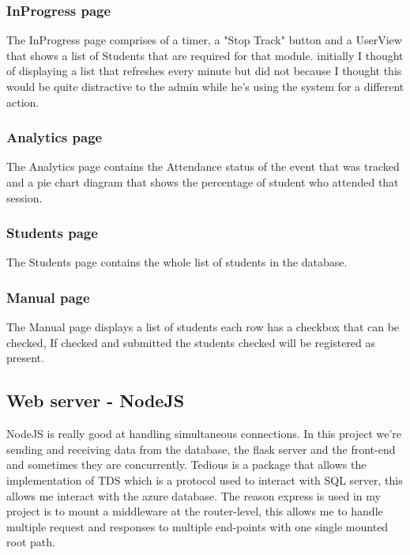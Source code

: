 \subsubsection{InProgress page}
The InProgress page comprises of a timer, a "Stop Track" button and a UserView that shows a list of Students that are required for that module. initially I thought of displaying a list that refreshes every minute but did not because I thought this would be quite distractive to the admin while he's using the system for a different action. 


\subsubsection{Analytics page}
The Analytics page contains the Attendance status of the event that was tracked and a pie chart diagram that shows the percentage of student who attended that session. 

\subsubsection{Students page}
The Students page contains the whole list of students in the database.

\subsubsection{Manual page}
The Manual page displays a list of students each row has a checkbox that can be checked, If checked and submitted the students checked will be registered as present.



\subsection{Web server - NodeJS}
NodeJS is really good at handling simultaneous connections. In this project we're sending and receiving data from the database, the flask server and the front-end and sometimes they are concurrently. Tedious is a package that allows the implementation of TDS which is a protocol used to interact with SQL server, this allows me interact with the azure database.
The reason express is used in my project is to mount a middleware at the router-level, this allows me to handle multiple request and responses to multiple end-points with one single mounted root path. 

